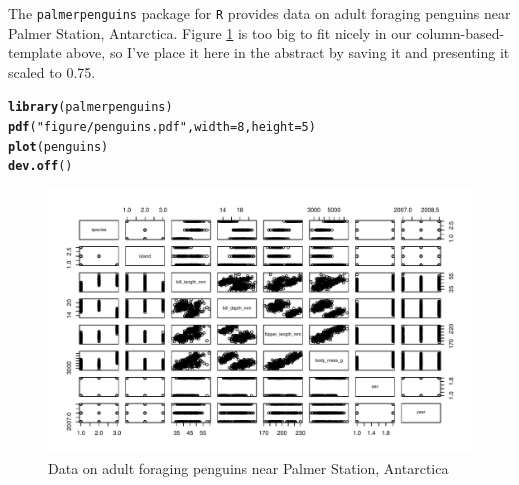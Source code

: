 \documentclass{article}\usepackage[]{graphicx}\usepackage[]{xcolor}
\makeatletter
\newcommand{\hlnum}[1]{\textcolor[rgb]{0.686,0.059,0.569}{#1}}%
\newcommand{\hlsng}[1]{\textcolor[rgb]{0.192,0.494,0.8}{#1}}%
\newcommand{\hldef}[1]{\textcolor[rgb]{0.345,0.345,0.345}{#1}}%
\newcommand{\hlkwc}[1]{\textcolor[rgb]{0.333,0.667,0.333}{#1}}%
\newcommand{\hlkwd}[1]{\textcolor[rgb]{0.737,0.353,0.396}{\textbf{#1}}}%
\newenvironment{kframe}{%
 \def\at@end@of@kframe{}%
 \ifinner\ifhmode%
  \def\at@end@of@kframe{\end{minipage}}%
  \begin{minipage}{\columnwidth}%
 \fi\fi%
 \def\FrameCommand##1{\hskip\@totalleftmargin \hskip-\fboxsep
 \colorbox{shadecolor}{##1}\hskip-\fboxsep
     \hskip-\linewidth \hskip-\@totalleftmargin \hskip\columnwidth}%
 \MakeFramed {\advance\hsize-\width
   \@totalleftmargin\z@ \linewidth\hsize
   \@setminipage}}%
 {\par\unskip\endMakeFramed%
 \at@end@of@kframe}
\newenvironment{knitrout}{}{} %
\makeatother
\begin{document}
The \texttt{palmerpenguins} package for \texttt{R} \citep{palmerpenguins} provides data on adult foraging penguins near Palmer Station, Antarctica. Figure \ref{penguinplot} is too big to fit nicely in our column-based-template above, so I've place it here in the abstract by saving it and presenting it scaled to 0.75. \\
\begin{knitrout}\scriptsize
{}\color{fgcolor}\begin{kframe}
\begin{alltt}
\hlkwd{library}\hldef{(palmerpenguins)}
\hlkwd{pdf}\hldef{(}\hlsng{"figure/penguins.pdf"}\hldef{,} \hlkwc{width} \hldef{=} \hlnum{8}\hldef{,} \hlkwc{height} \hldef{=} \hlnum{5}\hldef{)}
\hlkwd{plot}\hldef{(penguins)}
\hlkwd{dev.off}\hldef{()}
\end{alltt}
\end{kframe}
\end{knitrout}
\begin{figure}[H]
\begin{center}
\includegraphics[scale=0.75]{figure/penguins.pdf}
\caption{Data on adult foraging penguins near Palmer Station, Antarctica}
\label{penguinplot}
\end{center}
\end{figure}
\end{document}
